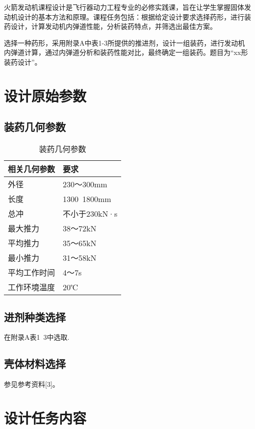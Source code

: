 火箭发动机课程设计是飞行器动力工程专业的必修实践课，旨在让学生掌握固体发动机设计的基本方法和原理。课程任务包括：根据给定设计要求选择药形，进行装药设计，计算发动机内弹道性能，分析装药特点，并筛选出最佳方案。

选择一种药形，采用附录A中表1-3所提供的推进剂，设计一组装药，进行发动机内弹道计算，通过内弹道分析和装药性能对比，最终确定一组装药。题目为“xx形装药设计”。

\section{设计原始参数}

\subsection{装药几何参数}

\begin{table}
  \centering
  \caption{装药几何参数}
  \begin{tabular}{ll}
    \toprule
    相关几何参数          & 要求                         \\
    \midrule
    外径   & 230～300mm \\
    长度   & 1300~1800mm                     \\
    总冲   & 不小于230kN·s    \\
    最大推力   & 38～72kN    \\
    平均推力   & 35～65kN    \\
    最小推力   & 31～58kN    \\
    平均工作时间   & 4～7s    \\
    工作环境温度   & 20℃    \\

    \bottomrule
  \end{tabular}
  \label{tab:three-line}
\end{table}

\subsection{进剂种类选择}

在附录A表1~3中选取.

\subsection{壳体材料选择}

参见参考资料[3]。

\section{设计任务内容}



